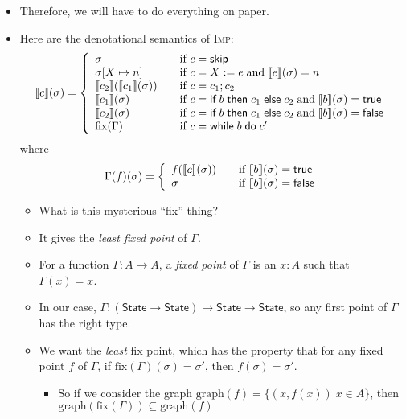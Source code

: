 \documentclass{lecturenotes}
\newcommand{\Imp}{\textsc{Imp}\xspace}
\newcommand{\Skip}{\textsf{skip}}
\newcommand{\ite}[3]{\ensuremath{\textsf{if}\mkern5mu#1 \mathrel{\textsf{then}} #2 \mathrel{\textsf{else}} #3}}
\newcommand{\while}[2]{\ensuremath{\textsf{while}\mkern5mu#1 \mathrel{\textsf{do}} #2}}
\newcommand{\itrue}{\textsf{true}}
\newcommand{\ifalse}{\textsf{false}}
\begin{document}
\begin{itemize}
\item Therefore, we will have to do everything on paper.
\item Here are the denotational semantics of \Imp:
  $$
  \llbracket c \rrbracket(\sigma) =
  \left\{\begin{array}{l@{\hspace{2em}\text{if~}}l}
      \sigma & c = \Skip\\
      \sigma[X \mapsto n] & c = X := e \mathrel{\text{and}} \llbracket e \rrbracket(\sigma) = n\\
      \llbracket c_2 \rrbracket(\llbracket c_1\rrbracket(\sigma)) & c = c_1; c_2\\
      \llbracket c_1 \rrbracket(\sigma) & c = \ite{b}{c_1}{c_2} \mathrel{\text{and}} \llbracket b \rrbracket(\sigma) = \itrue\\
    \llbracket c_2 \rrbracket(\sigma) & c = \ite{b}{c_1}{c_2} \mathrel{\text{and}} \llbracket b \rrbracket(\sigma) = \ifalse\\
    \text{fix}(\Gamma) & c = \while{b}{c'}
    \end{array}\right.
  $$
  where $$\Gamma(f)(\sigma) =
  \left\{\begin{array}{l@{\hspace{2em}\text{if~}}l}
    f(\llbracket c \rrbracket(\sigma)) & \llbracket b \rrbracket(\sigma) = \itrue\\
    \sigma & \llbracket b \rrbracket(\sigma) = \ifalse\\
  \end{array}\right.$$
\begin{itemize}
\item What is this mysterious ``fix'' thing?
\item It gives the \emph{least fixed point} of $\Gamma$.
\item For a function $\Gamma : A \to A$, a \emph{fixed point} of $\Gamma$ is an $x : A$ such that $\Gamma(x) = x$.
\item In our case, $\Gamma : (\textsf{State} \to \textsf{State}) \to \textsf{State} \to \textsf{State}$, so any first point of $\Gamma$ has the right type.
\item We want the \emph{least} fix point, which has the property that for any fixed point $f$ of $\Gamma$, if $\text{fix}(\Gamma)(\sigma) = \sigma'$, then $f(\sigma) = \sigma'$.
  \begin{itemize}
  \item So if we consider the graph $\text{graph}(f) = \{ (x, f(x)) | x \in A \}$, then
    $\text{graph}(\text{fix}(\Gamma)) \subseteq \text{graph}(f)$

\end{itemize}
\end{itemize}
\end{itemize}
\end{document}
